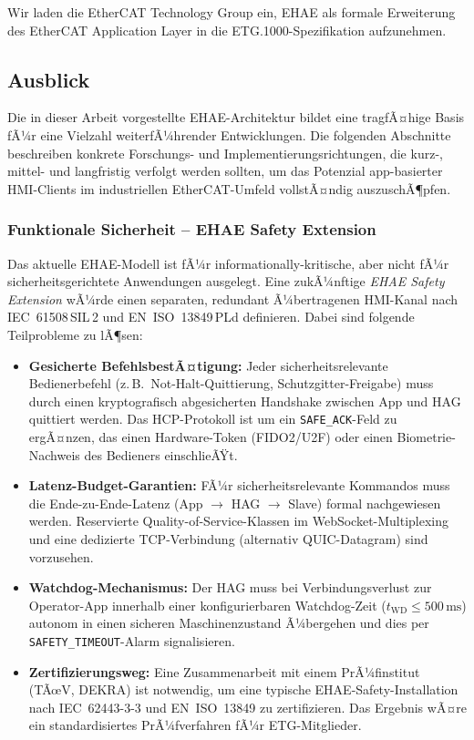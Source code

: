 ﻿\documentclass[12pt,a4paper]{article}
\begin{document}
Wir laden die EtherCAT Technology Group ein, EHAE als formale Erweiterung des EtherCAT
Application Layer in die ETG.1000-Spezifikation aufzunehmen.

\subsection{Ausblick}

Die in dieser Arbeit vorgestellte EHAE-Architektur bildet eine tragfÃ¤hige Basis fÃ¼r
eine Vielzahl weiterfÃ¼hrender Entwicklungen. Die folgenden Abschnitte beschreiben
konkrete Forschungs- und Implementierungsrichtungen, die kurz-, mittel- und
langfristig verfolgt werden sollten, um das Potenzial app-basierter HMI-Clients im
industriellen EtherCAT-Umfeld vollstÃ¤ndig auszuschÃ¶pfen.

\subsubsection*{Funktionale Sicherheit -- EHAE Safety Extension}

Das aktuelle EHAE-Modell ist fÃ¼r informationally-kritische, aber nicht fÃ¼r
sicherheitsgerichtete Anwendungen ausgelegt. Eine zukÃ¼nftige \emph{EHAE Safety
Extension} wÃ¼rde einen separaten, redundant Ã¼bertragenen HMI-Kanal nach
IEC~61508\,SIL\,2 und EN~ISO~13849\,PLd definieren. Dabei sind folgende
Teilprobleme zu lÃ¶sen:

\begin{itemize}[leftmargin=2em]
  \item \textbf{Gesicherte BefehlsbestÃ¤tigung:} Jeder sicherheitsrelevante
    Bedienerbefehl (z.\,B.\ Not-Halt-Quittierung, Schutzgitter-Freigabe) muss
    durch einen kryptografisch abgesicherten Handshake zwischen App und HAG
    quittiert werden. Das HCP-Protokoll ist um ein \verb|SAFE_ACK|-Feld zu
    ergÃ¤nzen, das einen Hardware-Token (FIDO2/U2F) oder einen
    Biometrie-Nachweis des Bedieners einschlieÃŸt.
  \item \textbf{Latenz-Budget-Garantien:} FÃ¼r sicherheitsrelevante Kommandos
    muss die Ende-zu-Ende-Latenz (App $\to$ HAG $\to$ Slave) formal nachgewiesen
    werden. Reservierte Quality-of-Service-Klassen im WebSocket-Multiplexing und
    eine dedizierte TCP-Verbindung (alternativ QUIC-Datagram) sind vorzusehen.
  \item \textbf{Watchdog-Mechanismus:} Der HAG muss bei Verbindungsverlust zur
    Operator-App innerhalb einer konfigurierbaren Watchdog-Zeit ($t_{\text{WD}}
    \leq 500\,\si{\milli\second}$) autonom in einen sicheren Maschinenzustand
    Ã¼bergehen und dies per \verb|SAFETY_TIMEOUT|-Alarm signalisieren.
  \item \textbf{Zertifizierungsweg:} Eine Zusammenarbeit mit einem PrÃ¼finstitut
    (TÃœV, DEKRA) ist notwendig, um eine typische EHAE-Safety-Installation nach
    IEC~62443-3-3 und EN~ISO~13849 zu zertifizieren. Das Ergebnis wÃ¤re ein
    standardisiertes PrÃ¼fverfahren fÃ¼r ETG-Mitglieder.
\end{itemize}
\end{document}
